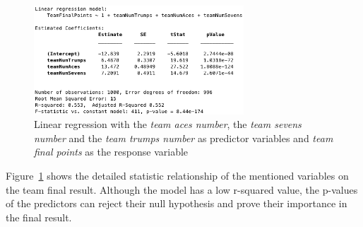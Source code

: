 \begin{figure}[h!]
  \centering
    \includegraphics[width=0.7\textwidth]{./img/4/linearRegression}
  \caption{Linear regression with the \emph{team aces number}, the \emph{team sevens number} and the \emph{team trumps number} as predictor variables and \emph{team final points} as the response variable}
\label{fig:linearRegression}
\end{figure}

Figure~\ref{fig:linearRegression} shows the detailed statistic relationship of the mentioned variables on the team final result.
Although the model has a low r-squared value, the p-values of the predictors can reject their null hypothesis and prove their importance in the final result.

